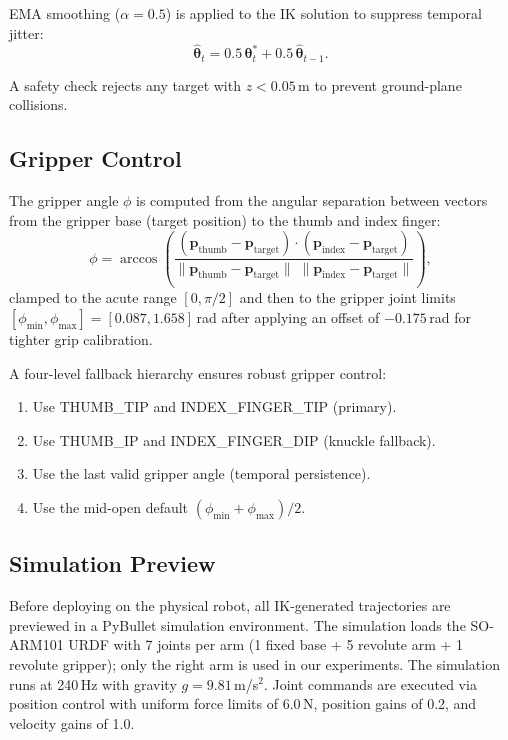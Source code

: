\documentclass[10pt,journal]{IEEEtran}
\newcommand{\vect}[1]{\mathbf{#1}}
\begin{document}
EMA smoothing ($\alpha = 0.5$) is applied to the IK solution to
suppress temporal jitter:
\begin{equation}
  \hat{\vect{\theta}}_t = 0.5\,\vect{\theta}^*_t
                        + 0.5\,\hat{\vect{\theta}}_{t-1}.
\end{equation}

A safety check rejects any target with $z < 0.05$\,m to prevent
ground-plane collisions.

\subsection{Gripper Control}
\label{sec:gripper}

The gripper angle $\phi$ is computed from the angular separation between
vectors from the gripper base (target position) to the thumb and index
finger:
\begin{equation}\label{eq:gripper}
  \phi = \arccos\!\left(
    \frac{(\vect{p}_{\text{thumb}} - \vect{p}_{\text{target}})
          \cdot
          (\vect{p}_{\text{index}} - \vect{p}_{\text{target}})}
         {\|\vect{p}_{\text{thumb}} - \vect{p}_{\text{target}}\|\;
          \|\vect{p}_{\text{index}} - \vect{p}_{\text{target}}\|}
  \right),
\end{equation}
clamped to the acute range $[0, \pi/2]$ and then to the gripper joint
limits $[\phi_{\min}, \phi_{\max}] = [0.087, 1.658]$\,rad after
applying an offset of $-0.175$\,rad for tighter grip calibration.

A four-level fallback hierarchy ensures robust gripper control:
\begin{enumerate}
  \item Use THUMB\_TIP and INDEX\_FINGER\_TIP (primary).
  \item Use THUMB\_IP and INDEX\_FINGER\_DIP (knuckle fallback).
  \item Use the last valid gripper angle (temporal persistence).
  \item Use the mid-open default $(\phi_{\min}+\phi_{\max})/2$.
\end{enumerate}

\subsection{Simulation Preview}
\label{sec:simulation}

Before deploying on the physical robot, all IK-generated trajectories
are previewed in a PyBullet simulation environment. The simulation
loads the SO-ARM101 URDF with 7 joints per arm
(1 fixed base + 5 revolute arm + 1 revolute gripper); only the
right arm is used in our experiments. The simulation
runs at 240\,Hz with gravity $g = 9.81$\,m/s$^2$. Joint commands
are executed via position control with uniform force limits of 6.0\,N,
position gains of 0.2, and velocity gains of 1.0.
\end{document}
